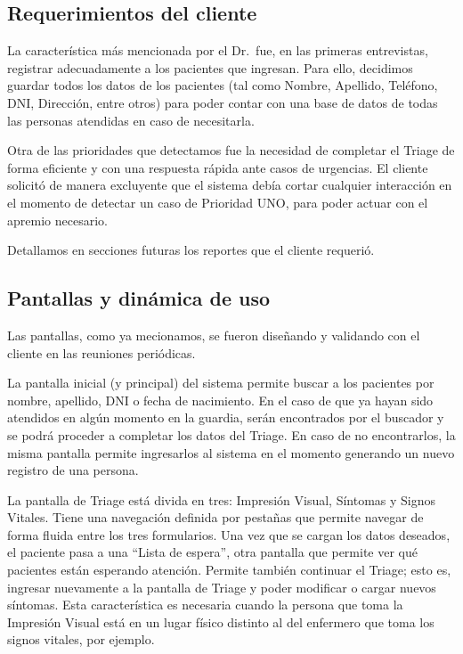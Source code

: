 \subsection{Requerimientos del cliente}
La característica más mencionada por el Dr.\ fue, en las primeras entrevistas, registrar adecuadamente a los pacientes que ingresan. Para ello, decidimos guardar todos los datos de los pacientes (tal como Nombre, Apellido, Teléfono, DNI, Dirección, entre otros) para poder contar con una base de datos de todas las personas atendidas en caso de necesitarla. 

Otra de las prioridades que detectamos fue la necesidad de completar el Triage de forma eficiente y con una respuesta rápida ante casos de urgencias. El cliente solicitó de manera excluyente que el sistema debía cortar cualquier interacción en el momento de detectar un caso de Prioridad UNO, para poder actuar con el apremio necesario.

Detallamos en secciones futuras los reportes que el cliente requerió.


\subsection{Pantallas y dinámica de uso}
Las pantallas, como ya mecionamos, se fueron diseñando y validando con el cliente en las reuniones periódicas.

La pantalla inicial (y principal) del sistema permite buscar a los pacientes por nombre, apellido, DNI o fecha de nacimiento. En el caso de que ya hayan sido atendidos en algún momento en la guardia, serán encontrados por el buscador y se podrá proceder a completar los datos del Triage. En caso de no encontrarlos, la misma pantalla permite ingresarlos al sistema en el momento generando un nuevo registro de una persona. 

La pantalla de Triage está divida en tres: Impresión Visual, Síntomas y Signos Vitales. Tiene una navegación definida por pestañas que permite navegar de forma fluida entre los tres formularios. Una vez que se cargan los datos deseados, el paciente pasa a una ``Lista de espera'', otra pantalla que permite ver qué pacientes están esperando atención. Permite también continuar el Triage; esto es, ingresar nuevamente a la pantalla de Triage y poder modificar o cargar nuevos síntomas. Esta característica es necesaria cuando la persona que toma la Impresión Visual está en un lugar físico distinto al del enfermero que toma los signos vitales, por ejemplo.

